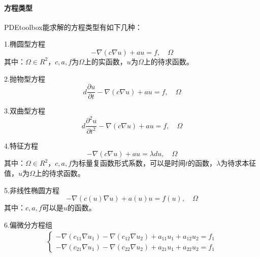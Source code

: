         \paragraph{方程类型}PDEtoolbox能求解的方程类型有如下几种：
        \par
        1.椭圆型方程
        \[
            - \nabla (c\nabla u) + au = f, \quad \Omega
        \]
        其中：$\Omega \in R^2$，$c,a,f$为$\Omega$上的实函数，$u$为$\Omega$上的待求函数。
        \par
        2.抛物型方程
        \[
            d \frac{\partial u}{\partial t} - \nabla(c\nabla u)+au = f, \quad \Omega
        \]
        \par
        3.双曲型方程
        \[
            d \frac{\partial^2 u}{\partial t^2} - \nabla(c\nabla u)+au = f, \quad \Omega
        \]
        \par
        4.特征方程
        \[
            -\nabla (c\nabla u)+au = \lambda du, \quad \Omega
        \]
        其中：$\Omega \in R^2$，$c,a,f$为标量复函数形式系数，可以是时间$t$的函数，$\lambda$为待求本征值，$u$为$\Omega$上的待求函数。
        \par
        5.非线性椭圆方程
        \[
            -\nabla (c(u) \nabla u) + a(u)u = f(u), \quad \Omega
        \]
        其中：$c,a,f$可以是$u$的函数。
        \par
        6.偏微分方程组
        \begin{align*}
            \left\{
            \begin{aligned}
            -\nabla(c_{11}\nabla {u_1}) - \nabla(c_{12}\nabla {u_2}) + a_{11}u_1 +a_{12} u_2 = f_1\\
            -\nabla(c_{21}\nabla {u_1}) - \nabla(c_{22}\nabla {u_2}) + a_{21}u_1 +a_{22} u_2 = f_1
            \end{aligned}
            \right.
        \end{align*}
